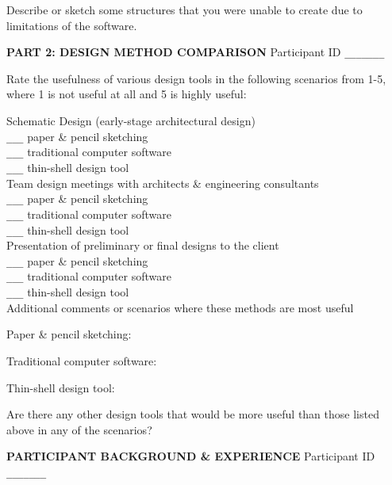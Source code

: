 \documentclass{thesis}
\begin{document}
Describe or sketch some structures that you were unable to create due to limitations of the software.
\vspace{1in}



\newpage
{\bf PART 2: DESIGN METHOD COMPARISON} 
\hfill Participant ID \verb+_______+
\vspace{0.3in}

Rate the usefulness of various design tools in the following scenarios from 1-5,
where 1 is not useful at all and 5 is highly useful:


Schematic Design (early-stage architectural design)\\
\verb+___+ paper \& pencil sketching \\
\verb+___+ traditional computer software \\
\verb+___+ thin-shell design tool \\
Team design meetings with architects \& engineering consultants\\
\verb+___+ paper \& pencil sketching \\
\verb+___+ traditional computer software \\
\verb+___+ thin-shell design tool \\
Presentation of preliminary or final designs to the client\\
\verb+___+ paper \& pencil sketching \\
\verb+___+ traditional computer software \\
\verb+___+ thin-shell design tool \\


Additional comments or scenarios where these methods are most useful
\vspace{0.15in}

\hspace*{0.3in} 
Paper \& pencil sketching:
\vspace{0.7in}

\hspace*{0.3in} 
Traditional computer software:
\vspace{0.7in}

\hspace*{0.3in} 
Thin-shell design tool:
\vspace{0.7in}

Are there any other design tools that would be more useful than those listed above
in any of the scenarios?


\newpage
{\bf PARTICIPANT BACKGROUND \& EXPERIENCE}
\hfill Participant ID \verb+_______+
\vspace{0.3in}
\end{document}
